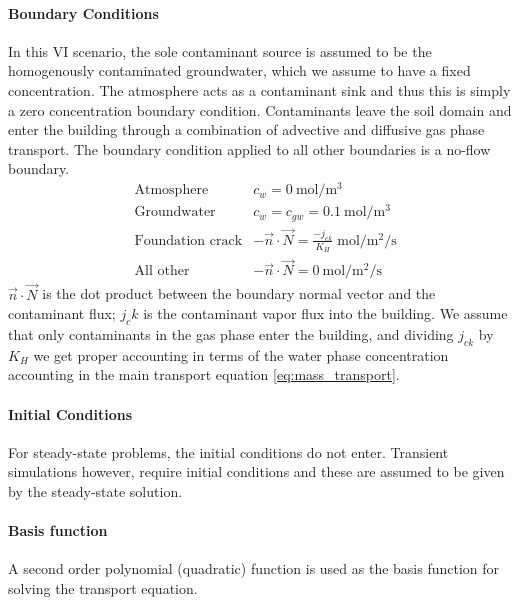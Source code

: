 
\paragraph{Boundary Conditions}

In this VI scenario, the sole contaminant source is assumed to be the homogenously contaminated groundwater, which we assume to have a fixed concentration.
The atmosphere acts as a contaminant sink and thus this is simply a zero concentration boundary condition.
Contaminants leave the soil domain and enter the building through a combination of advective and diffusive gas phase transport.
The boundary condition applied to all other boundaries is a no-flow boundary.
\begin{align}
  &\text{Atmosphere} & c_w = \SI{0}{\mol\per\metre\cubed} \\
  &\text{Groundwater} & c_w = c_{gw} = \SI{0.1}{\mol\per\metre\cubed} \\ %
  &\text{Foundation crack} & -\vec{n} \cdot \vec{N} = \frac{-j_{ck}}{K_H} \; \si{\mol\per\metre\squared\per\second}\\
  &\text{All other} & -\vec{n} \cdot \vec{N} = \SI{0}{\mol\per\metre\squared\per\second}
\end{align}
$\vec{n} \cdot \vec{N}$ is the dot product between the boundary normal vector and the contaminant flux;
$j_ck$ is the contaminant vapor flux into the building.
We assume that only contaminants in the gas phase enter the building, and dividing $j_{ck}$ by $K_H$ we get proper accounting in terms of the water phase concentration accounting in the main transport equation \ref{eq:mass_transport}.\par

\paragraph{Initial Conditions}

For steady-state problems, the initial conditions do not enter.
Transient simulations however, require initial conditions and these are assumed to be given by the steady-state solution.\par

\paragraph{Basis function}

A second order polynomial (quadratic) function is used as the basis function for solving the transport equation.\par
